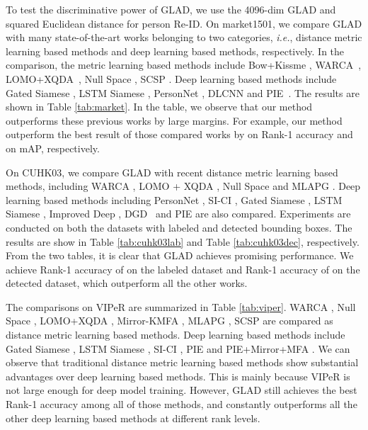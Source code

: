 \documentclass[sigconf]{acmart}
\begin{document}
To test the discriminative power of GLAD, we use the 4096-dim GLAD and squared Euclidean distance for person Re-ID. On market1501, we compare GLAD with many state-of-the-art works belonging to two categories, \emph{i.e.}, distance metric learning based methods and deep learning based methods, respectively. In the comparison, the metric learning based methods include Bow+Kissme \cite{market1501}, WARCA~\cite{WARCA}, LOMO+XQDA~\cite{LOMOXQAD}, Null Space \cite{LDNS}, SCSP \cite{scsp}. Deep learning based methods include Gated Siamese \cite{GatedSiamese}, LSTM Siamese \cite{varior2016siamese}, PersonNet \cite{wu2016personnet}, DLCNN \cite{zheng2016discriminatively} and PIE~\cite{zheng2017pose}. The results are shown in Table \ref{tab:market}. In the table, we observe that our method outperforms these previous works by large margins. For example, our method outperform the best result of those compared works by  on Rank-1 accuracy and  on mAP, respectively.

On CUHK03, we compare GLAD with recent distance metric learning based methods, including WARCA \cite{WARCA}, LOMO + XQDA \cite{LOMOXQAD}, Null Space \cite{LDNS} and MLAPG \cite{MLAPG}. Deep learning based methods including PersonNet \cite{wu2016personnet}, SI-CI \cite{SICI}, Gated Siamese \cite{GatedSiamese}, LSTM Siamese \cite{varior2016siamese}, Improved Deep \cite{ahmed2015improved}, DGD~\cite{xiao2016learning} and PIE \cite{zheng2017pose} are also compared. Experiments are conducted on both the datasets with labeled and detected bounding boxes. The results are show in Table \ref{tab:cuhk03lab} and Table \ref{tab:cuhk03dec}, respectively. From the two tables, it is clear that GLAD achieves promising performance. We achieve Rank-1 accuracy of  on the labeled dataset and Rank-1 accuracy of  on the detected dataset, which outperform all the other works.

The comparisons on VIPeR are summarized in Table \ref{tab:viper}. WARCA \cite{WARCA}, Null Space \cite{LDNS}, LOMO+XQDA \cite{LOMOXQAD}, Mirror-KMFA \cite{MirrorKFDA}, MLAPG \cite{MLAPG}, SCSP \cite{scsp} are compared as distance metric learning based methods. Deep learning based methods include Gated Siamese \cite{GatedSiamese}, LSTM Siamese \cite{varior2016siamese}, SI-CI \cite{SICI}, PIE \cite{zheng2017pose} and PIE+Mirror+MFA \cite{zheng2017pose}. We can observe that traditional distance metric learning based methods show substantial advantages over deep learning based methods. This is mainly because VIPeR is not large enough for deep model training. However, GLAD still achieves the best Rank-1 accuracy among all of those methods, and constantly outperforms all the other deep learning based methods at different rank levels.
\end{document}
